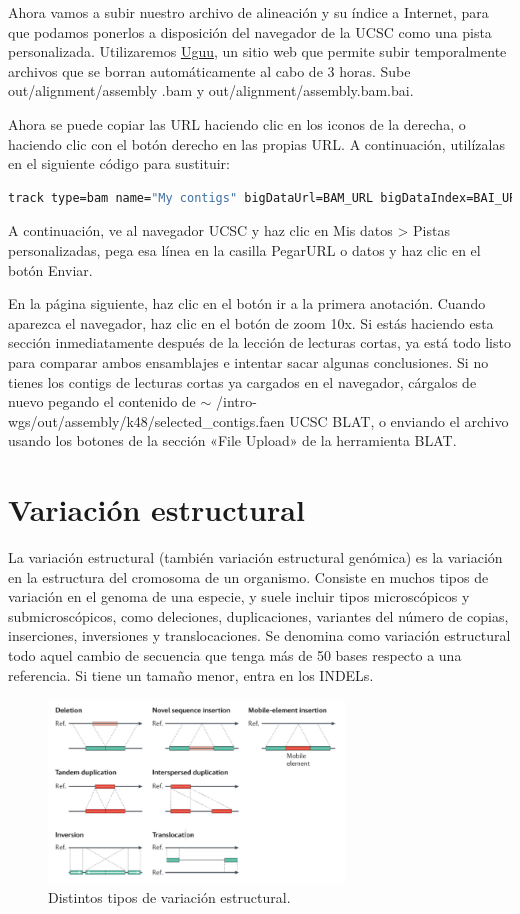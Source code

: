 \begin{itemize}
Ahora vamos a subir nuestro archivo de alineación y su índice a Internet, para que podamos ponerlos a disposición del navegador de la UCSC como una pista personalizada.
Utilizaremos \href{https://uguu.se/}{Uguu}, un sitio web que permite subir temporalmente archivos que se borran automáticamente al cabo de 3 horas.
Sube out/alignment/assembly .bam y out/alignment/assembly.bam.bai. 

Ahora se puede copiar las URL haciendo clic en los iconos de la derecha, o haciendo clic con el botón derecho en las propias URL. A continuación, utilízalas en el siguiente código para sustituir:
\begin{lstlisting}[language=bash]
track type=bam name="My contigs" bigDataUrl=BAM_URL bigDataIndex=BAI_URL
\end{lstlisting}

A continuación, ve al navegador UCSC y haz clic en Mis datos > Pistas personalizadas, pega esa línea en la casilla PegarURL o datos y haz clic en el botón Enviar.

En la página siguiente, haz clic en el botón ir a la primera anotación. Cuando aparezca el navegador, haz clic en el botón de zoom 10x.
Si estás haciendo esta sección inmediatamente después de la lección de lecturas cortas, ya está todo listo para comparar ambos ensamblajes e intentar sacar algunas conclusiones.
Si no tienes los contigs de lecturas cortas ya cargados en el navegador, cárgalos de nuevo pegando el contenido de $\sim$ /intro-wgs/out/assembly/k48/selected\_contigs.faen UCSC BLAT, o enviando el archivo usando los botones de la sección «File Upload» de la herramienta BLAT.

\chapter{Variación estructural}
La variación estructural (también variación estructural genómica) es la variación en la estructura del cromosoma de un organismo. Consiste en muchos tipos de variación en el genoma de una especie, y suele incluir tipos microscópicos y submicroscópicos, como deleciones, duplicaciones, variantes del número de copias, inserciones, inversiones y translocaciones. Se denomina como variación estructural todo aquel cambio de secuencia que tenga más de 50 bases respecto a una referencia. Si tiene un tamaño menor, entra en los INDELs.

\begin{figure}[h!]
\centering
\includegraphics[width = 0.7\textwidth]{figs/types-sv.png}
\caption{Distintos tipos de variación estructural.}
\end{figure}


\end{itemize}

